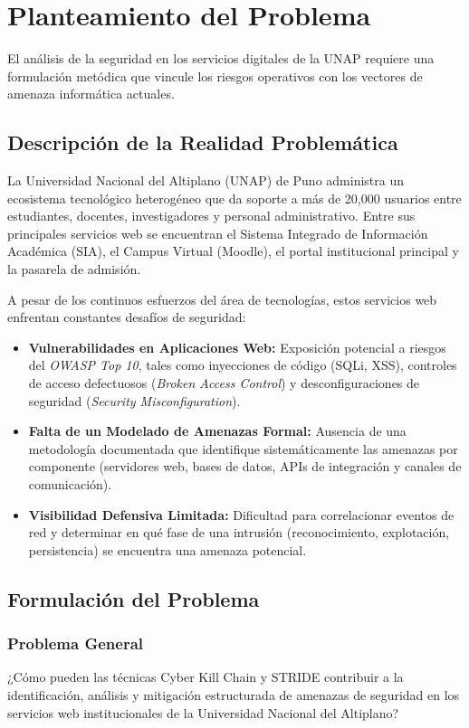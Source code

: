 \chapter{Planteamiento del Problema}
\label{ch:planteamiento}

El análisis de la seguridad en los servicios digitales de la UNAP requiere una formulación metódica que vincule los riesgos operativos con los vectores de amenaza informática actuales.

\section{Descripción de la Realidad Problemática}
La Universidad Nacional del Altiplano (UNAP) de Puno administra un ecosistema tecnológico heterogéneo que da soporte a más de 20,000 usuarios entre estudiantes, docentes, investigadores y personal administrativo. Entre sus principales servicios web se encuentran el Sistema Integrado de Información Académica (SIA), el Campus Virtual (Moodle), el portal institucional principal y la pasarela de admisión.

A pesar de los continuos esfuerzos del área de tecnologías, estos servicios web enfrentan constantes desafíos de seguridad:
\begin{itemize}
    \item \textbf{Vulnerabilidades en Aplicaciones Web:} Exposición potencial a riesgos del \textit{OWASP Top 10}, tales como inyecciones de código (SQLi, XSS), controles de acceso defectuosos (\textit{Broken Access Control}) y desconfiguraciones de seguridad (\textit{Security Misconfiguration}).
    \item \textbf{Falta de un Modelado de Amenazas Formal:} Ausencia de una metodología documentada que identifique sistemáticamente las amenazas por componente (servidores web, bases de datos, APIs de integración y canales de comunicación).
    \item \textbf{Visibilidad Defensiva Limitada:} Dificultad para correlacionar eventos de red y determinar en qué fase de una intrusión (reconocimiento, explotación, persistencia) se encuentra una amenaza potencial.
\end{itemize}

\section{Formulación del Problema}
\subsection{Problema General}
¿Cómo pueden las técnicas Cyber Kill Chain y STRIDE contribuir a la identificación, análisis y mitigación estructurada de amenazas de seguridad en los servicios web institucionales de la Universidad Nacional del Altiplano?


